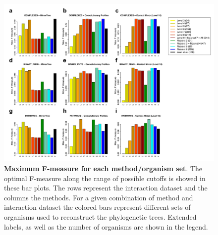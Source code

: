 \begin{figure}[htbp]
\centering
\includegraphics[keepaspectratio,width=\textwidth,height=0.75\textheight]{../figures/selectionMaxFmeasure.pdf}
\caption{\textbf{Maximum F-measure for each method\slash organism set}. The optimal F-measure along the range of possible cutoffs is showed in these bar plots. The rows represent the interaction dataset and the columns the methods. For a given combination of method and interaction dataset the colored bars represent different sets of organisms used to reconstruct the phylogenetic trees. Extended labels, as well as the number of organisms are shown in the legend.}
\label{selectionmaxfmeasure.pdf}
\end{figure}


